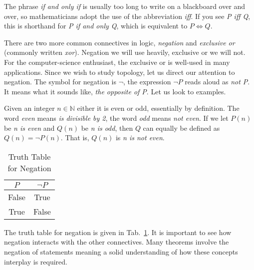             The phrase \textit{if and only if} is usually too long to write on
            a blackboard over and over, so mathematicians adopt the use of the
            abbreviation \textit{iff}. If you see \textit{P iff Q}, this is
            shorthand for \textit{P if and only Q}, which is equivalent to
            $P\Leftrightarrow{Q}$.
            \par\hfill\par
            There are two more common connectives in logic, \textit{negation}
            and \textit{exclusive or} (commonly written \textit{xor}). Negation
            we will use heavily, exclusive or we will not. For the
            computer-science enthusiast, the exclusive or is well-used in many
            applications. Since we wish to study topology, let us direct our
            attention to negation. The symbol for negation is $\neg$, the
            expression $\neg{P}$ reads aloud as \textit{not P}. It means what it
            sounds like, \textit{the opposite of P}. Let us look to examples.
            \begin{example}
                Given an integer $n\in\mathbb{N}$ either it is even or odd,
                essentially by definition. The word \textit{even} means
                \textit{is divisible by 2}, the word \textit{odd} means
                \textit{not even}. If we let $P(n)$ be \textit{n is even} and
                $Q(n)$ be \textit{n is odd}, then $Q$ can equally be defined as
                $Q(n)=\neg{P}(n)$. That is, $Q(n)$ is \textit{n is not even}.
            \end{example}
            \begin{table}
                \centering
                \begin{tabular}{c | c }
                    $P$&$\neg{P}$\\
                    \hline
                    False&True\\
                    \hline
                    True&False
                \end{tabular}
                \caption{Truth Table for Negation}
                \label{tab:truth_table_negation}
            \end{table}
            The truth table for negation is given in
            Tab.~\ref{tab:truth_table_negation}. It is important to see how
            negation interacts with the other connectives. Many theorems
            involve the negation of statements meaning a solid understanding of
            how these concepts interplay is required.
